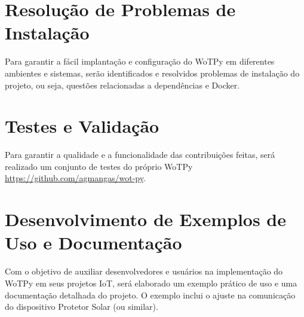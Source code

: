\section{Resolução de Problemas de Instalação} \label{instalação}

Para garantir a fácil implantação e configuração do WoTPy em diferentes ambientes e sistemas, serão identificados e resolvidos problemas de instalação do projeto, ou seja, questões relacionadas a dependências e Docker.

\section{Testes e Validação} \label{teste}

Para garantir a qualidade e a funcionalidade das contribuições feitas, será realizado um conjunto de testes do próprio WoTPy \url{https://github.com/agmangas/wot-py}.

\section{Desenvolvimento de Exemplos de Uso e Documentação} \label{uso}

Com o objetivo de auxiliar desenvolvedores e usuários na implementação do WoTPy em seus projetos IoT, será elaborado um exemplo prático de uso e uma documentação detalhada do projeto. O exemplo inclui o ajuste na comunicação do dispositivo Protetor Solar \cite{ProtetorSolar} (ou similar).